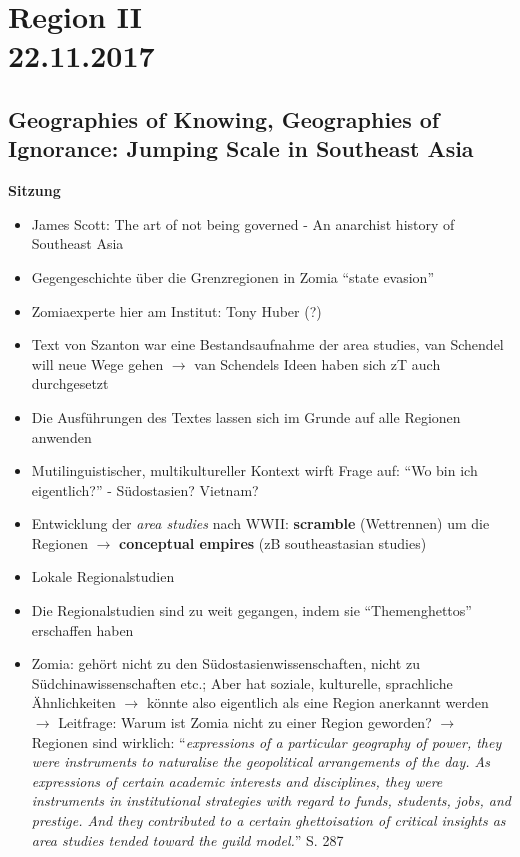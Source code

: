 \documentclass[emulatestandardclasses]{scrartcl}
\begin{document}
\section{Region II\\22.11.2017}

\subsection{Geographies of Knowing, Geographies of Ignorance: Jumping Scale in Southeast Asia}

\textbf{Sitzung}

\begin{itemize}
  \item James Scott: The art of not being governed - An anarchist history of Southeast Asia
  \item Gegengeschichte über die Grenzregionen in Zomia "`state evasion"'
  \item Zomiaexperte hier am Institut: Tony Huber (?)
  \item Text von Szanton war eine Bestandsaufnahme der area studies, van Schendel will neue Wege gehen $\rightarrow$ van Schendels Ideen haben sich zT auch durchgesetzt
  \item Die Ausführungen des Textes lassen sich im Grunde auf alle Regionen anwenden
  \item Mutilinguistischer, multikultureller Kontext wirft Frage auf: "`Wo bin ich eigentlich?"' - Südostasien? Vietnam?
  \item Entwicklung der \emph{area studies} nach WWII: \textbf{scramble} (Wettrennen) um die Regionen $\rightarrow$ \textbf{conceptual empires} (zB southeastasian studies)
  \item Lokale Regionalstudien
  \item Die Regionalstudien sind zu weit gegangen, indem sie "`Themenghettos"' erschaffen haben
  \item Zomia: gehört nicht zu den Südostasienwissenschaften, nicht zu Südchinawissenschaften etc.; Aber hat soziale, kulturelle, sprachliche Ähnlichkeiten $\rightarrow$ könnte also eigentlich als eine Region anerkannt werden $\rightarrow$ Leitfrage: Warum ist Zomia nicht zu einer Region geworden? $\rightarrow$ Regionen sind wirklich: "`\emph{expressions of a particular geography of power, they were instruments to naturalise the geopolitical arrangements of the day. As expressions of certain academic interests and disciplines, they were instruments in institutional strategies with regard to funds, students, jobs, and prestige. And they contributed to a certain ghettoisation of critical insights as area studies tended toward the guild model.}"' S. 287

\end{itemize}
\end{document}
